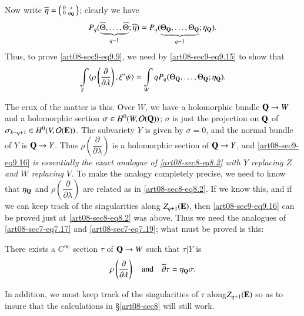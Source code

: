 Now write $\widehat{\eta}=\left(\begin{smallmatrix} 0 & *\\ 0 & \eta_{\mathbf{Q}}\end{smallmatrix}\right)$; clearly we have 
$$
P_{q}(\underbrace{\widehat{\Theta},\ldots,\widehat{\Theta}}_{q-1};\widehat{\eta})=P_{q}(\underbrace{\Theta_{\mathbf{Q}},\ldots,\Theta_{\mathbf{Q}}}_{q-1};\eta_{\mathbf{Q}}).
$$ 
Thus, to prove \eqref{art08-sec9-eq9.9}, we need by \eqref{art08-sec9-eq9.15} to show that
\begin{equation}
\int\limits_{Y}\langle \rho\left(\dfrac{\partial}{\partial\lambda}\right), \xi^{*}\psi\rangle = \int\limits_{W}qP_{q}(\Theta_{\mathbf{Q}},\ldots,\Theta_{\mathbf{Q}};\eta_{\mathbf{Q}}).\label{art08-sec9-eq9.16}
\end{equation}

The crux of the matter is this. Over $W$, we have a holomorphic bundle $\mathbf{Q}\to W$ and a holomorphic section $\sigma\in H^{0}(W,\mathcal{O}(\mathbf{Q}))$; $\sigma$ is just the projection on $\mathbf{Q}$ of $\sigma_{k-q+1}\in H^{0}(V,\mathcal{O}(\mathbf{E}))$. The subvariety $Y$ is given by $\sigma=0$, and the normal bundle of $Y$ is $\mathbf{Q}\to Y$. Thus $\rho\left(\dfrac{\partial}{\partial\lambda}\right)$ is a holomorphic section of $\mathbf{Q}\to Y$, and \eqref{art08-sec9-eq9.16} {\em is essentially the exact analogue of \eqref{art08-sec8-eq8.2} with $Y$ replacing $Z$ and $W$ replacing $V$.} To make the analogy completely precise, we need to know that $\eta_{\mathbf{Q}}$ and $\rho\left(\dfrac{\partial}{\partial\lambda}\right)$ are related as in \eqref{art08-sec8-eq8.2}. If we know this, and if we can keep track of the singularities along $Z_{q+1}(\mathbf{E})$, then \eqref{art08-sec9-eq9.16} can be proved just at \eqref{art08-sec8-eq8.2} was above. Thus we need the analogues of \eqref{art08-sec7-eq7.17} and \eqref{art08-sec7-eq7.19}; what must be proved is this:

There exists a $C^{\infty}$ section $\tau$ of $\mathbf{Q}\to W$ such that $\tau|Y$ is
\begin{equation}
\rho\left(\frac{\partial}{\partial\lambda}\right)\quad\text{and}\quad \overline{\partial}\tau=\eta_{\mathbf{Q}}\sigma.\label{art08-sec9-eq9.17}
\end{equation}

In addition, we must keep track of the singularities of $\tau$ along\break $Z_{q+1}(\mathbf{E})$ so as to insure that the calculations in \S\ref{art08-sec8} will still work.

